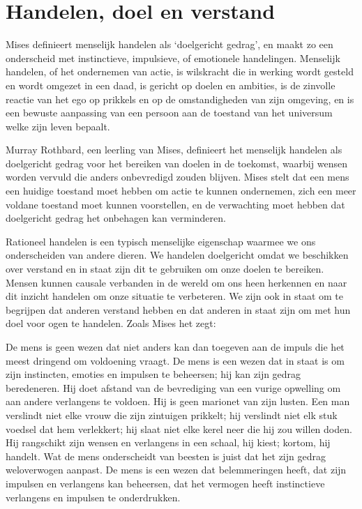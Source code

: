 \section{Handelen, doel en verstand}

Mises definieert menselijk handelen als `doelgericht gedrag', en maakt zo een onderscheid met instinctieve, impulsieve, of emotionele handelingen.\autocite{2} Menselijk handelen, of het ondernemen van actie, is wilskracht die in werking wordt gesteld en wordt omgezet in een daad, is gericht op doelen en ambities, is de zinvolle reactie van het ego op prikkels en op de omstandigheden van zijn omgeving, en is een bewuste aanpassing van een persoon aan de toestand van het universum welke zijn leven bepaalt.

Murray Rothbard, een leerling van Mises, definieert het menselijk handelen als doelgericht gedrag voor het bereiken van doelen in de toekomst, waarbij wensen worden vervuld die anders onbevredigd zouden blijven.\autocite{3} Mises stelt dat een mens een huidige toestand moet hebben om actie te kunnen ondernemen, zich een meer voldane toestand moet kunnen voorstellen, en de verwachting moet hebben dat doelgericht gedrag het onbehagen kan verminderen.\autocite{4}

Rationeel handelen is een typisch menselijke eigenschap waarmee we ons onderscheiden van andere dieren. We handelen doelgericht omdat we beschikken over verstand en in staat zijn dit te gebruiken om onze doelen te bereiken. Mensen kunnen causale verbanden in de wereld om ons heen herkennen en naar dit inzicht handelen om onze situatie te verbeteren. We zijn ook in staat om te begrijpen dat anderen verstand hebben en dat anderen in staat zijn om met hun doel voor ogen te handelen. Zoals Mises het zegt:

\begin{blockquotebox}De mens is geen wezen dat niet anders kan dan toegeven aan de impuls die het meest dringend om voldoening vraagt. De mens is een wezen dat in staat is om zijn instincten, emoties en impulsen te beheersen; hij kan zijn gedrag beredeneren. Hij doet afstand van de bevrediging van een vurige opwelling om aan andere verlangens te voldoen. Hij is geen marionet van zijn lusten. Een man verslindt niet elke vrouw die zijn zintuigen prikkelt; hij verslindt niet elk stuk voedsel dat hem verlekkert; hij slaat niet elke kerel neer die hij zou willen doden. Hij rangschikt zijn wensen en verlangens in een schaal, hij kiest; kortom, hij handelt. Wat de mens onderscheidt van beesten is juist dat het zijn gedrag weloverwogen aanpast. De mens is een wezen dat belemmeringen heeft, dat zijn impulsen en verlangens kan beheersen, dat het vermogen heeft instinctieve verlangens en impulsen te onderdrukken.\footnotemark 
\end{blockquotebox}

